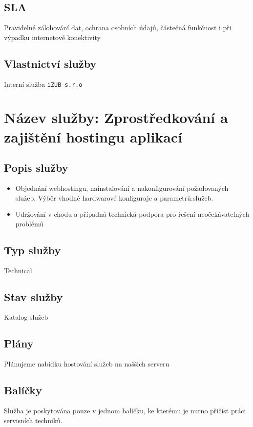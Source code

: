\documentclass[12pt, a4paper, titlepage]{article}
\begin{document}
	\subsection*{SLA}
	Pravidelné zálohování dat, ochrana osobních údajů, částečná funkčnost i při výpadku internetové konektivity

	\subsection*{Vlastnictví služby}
	Interní služba \texttt{iZUB s.r.o}

	\newpage

	\noindent\makebox[\linewidth]{\rule{16cm}{0.4pt}}

	\section*{Název služby: Zprostředkování a zajištění hostingu aplikací}	

	\subsection*{Popis služby}
	\begin{itemize}
		\item Objednání webhostingu, nainstalování a nakonfigurování požadovaných služeb. Výběr vhodné hardwarové konfiguraje a parametrů.služeb.
		\item Udržování v chodu a případná technická podpora pro řešení neočekávatelných problémů
	\end{itemize}

	\subsection*{Typ služby}
	Technical

	\subsection*{Stav služby}
	Katalog služeb

	\subsection*{Plány}
	Plánujeme nabídku hostování služeb na naššich serveru

	\subsection*{Balíčky}
	Služba je poskytována pouze v jednom balíčku, ke kterému je nutno přičíst práci servisních techniků. 
\end{document}
